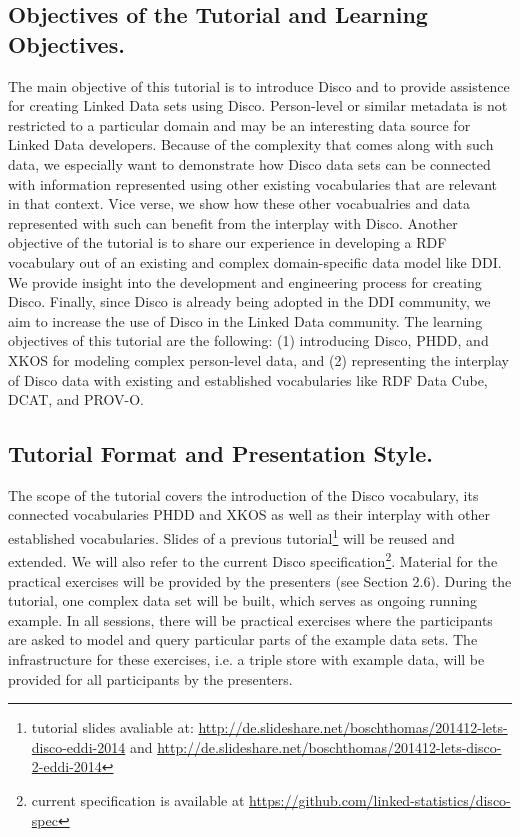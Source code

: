 \documentclass{llncs}
\begin{document}
\subsection{Objectives of the Tutorial and Learning Objectives.} 
The main objective of this tutorial is to introduce Disco and to provide assistence for creating Linked Data sets using Disco. Person-level or similar metadata is not restricted to a particular domain and may be an interesting data source for Linked Data developers.
Because of the complexity that comes along with such data, we especially want to demonstrate how Disco data sets can be connected with information represented using other existing vocabularies that are relevant in that context. Vice verse, we show how these other vocabualries and data represented with such can benefit from the interplay with Disco.
Another objective of the tutorial is to share our experience in developing a RDF vocabulary out of an existing and complex domain-specific data model like DDI. We provide insight into the development and engineering process for creating Disco.
Finally, since Disco is already being adopted in the DDI community, we aim to increase the use of Disco in the Linked Data community.
The learning objectives of this tutorial are the following: (1) introducing Disco, PHDD, and XKOS for modeling complex person-level data, and (2) representing the interplay of Disco data with existing and established vocabularies like RDF Data Cube, DCAT, and PROV-O.

\subsection{Tutorial Format and Presentation Style.}
The scope of the tutorial covers the introduction of the Disco vocabulary, its connected vocabularies PHDD and XKOS as well as their interplay with other established vocabularies.
Slides of a previous tutorial\footnote{tutorial slides avaliable at: \url{http://de.slideshare.net/boschthomas/201412-lets-disco-eddi-2014} and \url{http://de.slideshare.net/boschthomas/201412-lets-disco-2-eddi-2014}} 
will be reused and extended. We will also refer to the current Disco specification\footnote{current specification is available at \url{https://github.com/linked-statistics/disco-spec}}.
Material for the practical exercises will be provided by the presenters (see Section 2.6).
During the tutorial, one complex data set will be built, which serves as ongoing running example. In all sessions, there will be practical exercises where the participants are asked to model and query particular parts of the example data sets. The infrastructure for these exercises, i.e. a triple store with example data, will be provided for all participants by the presenters.
\end{document}
